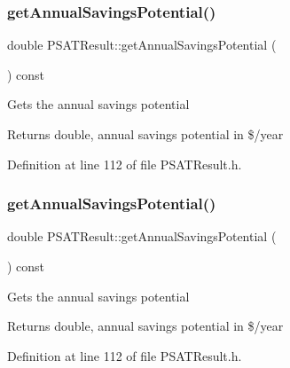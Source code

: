 \subsubsection{\texorpdfstring{get\+Annual\+Savings\+Potential()}{getAnnualSavingsPotential()}\hspace{0.1cm}{\footnotesize\ttfamily [2/3]}}
{\footnotesize\ttfamily double P\+S\+A\+T\+Result\+::get\+Annual\+Savings\+Potential (\begin{DoxyParamCaption}{ }\end{DoxyParamCaption}) const\hspace{0.3cm}{\ttfamily [inline]}}

Gets the annual savings potential

\begin{DoxyReturn}{Returns}
double, annual savings potential in \$/year 
\end{DoxyReturn}


Definition at line 112 of file P\+S\+A\+T\+Result.\+h.

\mbox{\label{class_p_s_a_t_result_a14fc75c2e0e92f74e3df1b97ed13b496}} 
\subsubsection{\texorpdfstring{get\+Annual\+Savings\+Potential()}{getAnnualSavingsPotential()}\hspace{0.1cm}{\footnotesize\ttfamily [3/3]}}
{\footnotesize\ttfamily double P\+S\+A\+T\+Result\+::get\+Annual\+Savings\+Potential (\begin{DoxyParamCaption}{ }\end{DoxyParamCaption}) const\hspace{0.3cm}{\ttfamily [inline]}}

Gets the annual savings potential

\begin{DoxyReturn}{Returns}
double, annual savings potential in \$/year 
\end{DoxyReturn}


Definition at line 112 of file P\+S\+A\+T\+Result.\+h.

\mbox{\label{class_p_s_a_t_result_a4da660959f368bdf0951728c9c5f931b}} 
